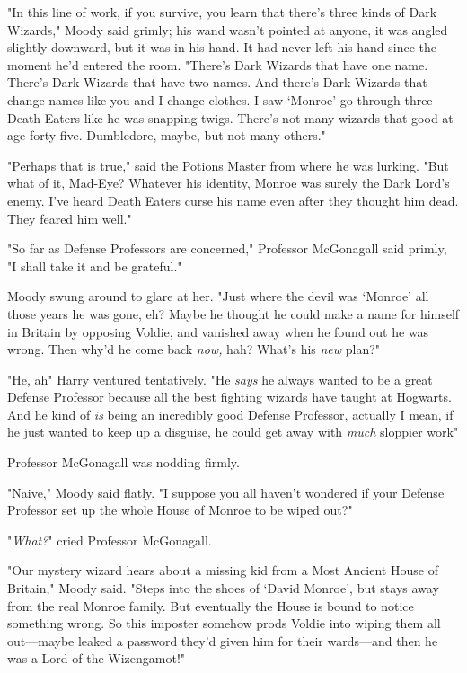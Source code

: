 "In this line of work, if you survive, you learn that there's three kinds of
Dark Wizards," Moody said grimly; his wand wasn't pointed at anyone, it was
angled slightly downward, but it was in his hand. It had never left his hand
since the moment he'd entered the room. "There's Dark Wizards that have one
name. There's Dark Wizards that have two names. And there's Dark Wizards that
change names like you and I change clothes. I saw `Monroe' go through three
Death Eaters like he was snapping twigs. There's not many wizards that good at
age forty-five. Dumbledore, maybe, but not many others."

"Perhaps that is true," said the Potions Master from where he was lurking. "But
what of it, Mad-Eye? Whatever his identity, Monroe was surely the Dark Lord's
enemy. I've heard Death Eaters curse his name even after they thought him dead.
They feared him well."

"So far as Defense Professors are concerned," Professor McGonagall said primly,
"I shall take it and be grateful."

Moody swung around to glare at her. "Just where the devil was `Monroe' all
those years he was gone, eh? Maybe he thought he could make a name for himself
in Britain by opposing Voldie, and vanished away when he found out he was
wrong. Then why'd he come back \emph{now,} hah? What's his \emph{new} plan?"

"He, ah{\el}" Harry ventured tentatively. "He \emph{says} he always wanted
to be a great Defense Professor because all the best fighting wizards have
taught at Hogwarts. And he kind of \emph{is} being an incredibly good Defense
Professor, actually{\el} I mean, if he just wanted to keep up a disguise, he
could get away with \emph{much} sloppier work{\el}"

Professor McGonagall was nodding firmly.

"Naive," Moody said flatly. "I suppose you all haven't wondered if your Defense
Professor set up the whole House of Monroe to be wiped out?"

"\emph{What?}" cried Professor McGonagall.

"Our mystery wizard hears about a missing kid from a Most Ancient House of
Britain," Moody said. "Steps into the shoes of `David Monroe', but stays away
from the real Monroe family. But eventually the House is bound to notice
something wrong. So this imposter somehow prods Voldie into wiping them all
out—maybe leaked a password they'd given him for their wards—and then he
was a Lord of the Wizengamot!"

